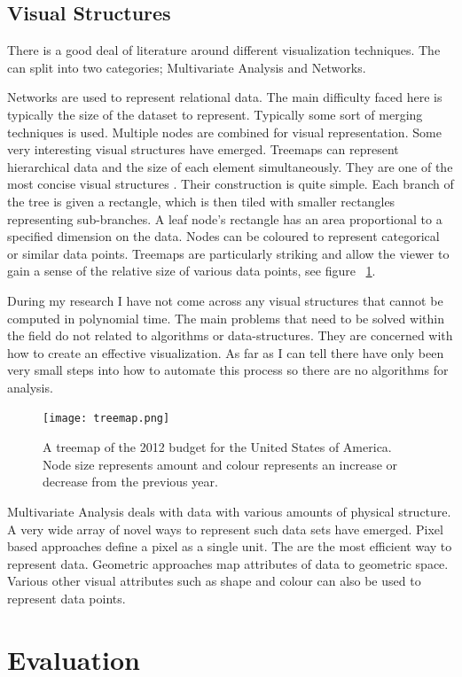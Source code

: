 \documentclass[a4paper, 10pt, titlepage, twocolumn, onehalfspace]{article}
\begin{document}
\subsection{Visual Structures}
There is a good deal of literature around different visualization techniques. The can split into two categories; Multivariate Analysis and Networks.

Networks are used to represent relational data. The main difficulty faced here is typically the size of the dataset to represent. Typically some sort of merging techniques is used. Multiple nodes are combined for visual representation. Some very interesting visual structures have emerged. Treemaps can represent hierarchical data and the size of each element simultaneously. They are one of the most concise visual structures \cite{shneiderman2001ordered}. Their construction is quite simple. Each branch of the tree is given a rectangle, which is then tiled with smaller rectangles representing sub-branches. A leaf node's rectangle has an area proportional to a specified dimension on the data. Nodes can be coloured to represent categorical or similar data points. Treemaps are particularly striking and allow the viewer to gain a sense of the relative size of various data points, see figure ~\ref{fig:treemap}. 

During my research I have not come across any visual structures that cannot be computed in polynomial time. The main problems that need to be solved within the field do not related to algorithms or data-structures. They are concerned with how to create an effective visualization. As far as I can tell there have only been very small steps into how to automate this process so there are no algorithms for analysis. 

\begin{figure}[hbt]
  \begin{center}
    \texttt{[image: treemap.png]}
  \end{center}
  \caption{\small A treemap of the 2012 budget for the United States of America. Node size represents amount and colour represents an increase or decrease from the previous year.}
  \label{fig:treemap}
\end{figure}

Multivariate Analysis deals with data with various amounts of physical structure. A very wide array of novel ways to represent such data sets have emerged. Pixel based approaches define a pixel as a single unit. The are the most efficient way to represent data. Geometric approaches map attributes of data to geometric space. Various other visual attributes such as shape and colour can also be used to represent data points.

\section{Evaluation}

\newpage


 


 
\end{document}
